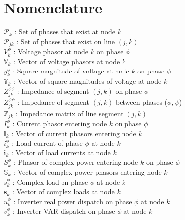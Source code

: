 \section*{Nomenclature}

\noindent $\mathcal{P}_{k}$ : Set of phases that exist at node $k$ \\
\noindent $\mathcal{P}_{jk}$ : Set of phases that exist on line $(j,k)$ \\
\noindent $V_{k}^{\phi}$ : Voltage phasor at node $k$ on phase $\phi$ \\
\noindent $\mathbb{V}_{k}$ : Vector of voltage phasors at node $k$ \\
\noindent $y_{k}^{\phi}$ : Square magnitude of voltage at node $k$ on phase $\phi$ \\ %
\noindent $\mathbb{Y}_{k}$ : Vector of square magnitudes of voltage at node $k$ \\
\noindent $Z_{jk}^{\phi \phi}$ : Impedance of segment $(j,k)$ on phase $\phi$ \\
\noindent $Z_{jk}^{\phi \psi}$ : Impedance of segment $(j,k)$ between phases ($\phi,\psi$) \\
\noindent $\mathbb{Z}_{jk}$ : Impedance matrix of line segment $(j,k)$ \\
\noindent $I_{k}^{\phi}$ : Current phasor entering node $k$ on phase $\phi$ \\
\noindent $\mathbb{I}_{k}$ : Vector of current phasors entering node $k$ \\
\noindent $i_{k}^{\phi}$ : Load current of phase $\phi$ at node $k$ \\
\noindent $\mathbf{i}_{k}$ : Vector of load currents at node $k$ \\
\noindent $S_{k}^{\phi}$ : Phasor of complex power entering node $k$ on phase $\phi$ \\
\noindent $\mathbb{S}_{k}$ : Vector of complex power phasors entering node $k$ \\
\noindent $s_{k}^{\phi}$ : Complex load on phase $\phi$ at node $k$ \\
\noindent $\mathbf{s}_{k}$ : Vector of complex loads at node $k$ \\
\noindent $u_{k}^{\phi}$ : Inverter real power dispatch on phase $\phi$ at node $k$ \\
\noindent $v_{k}^{\phi}$ : Inverter VAR dispatch on phase $\phi$ at node $k$